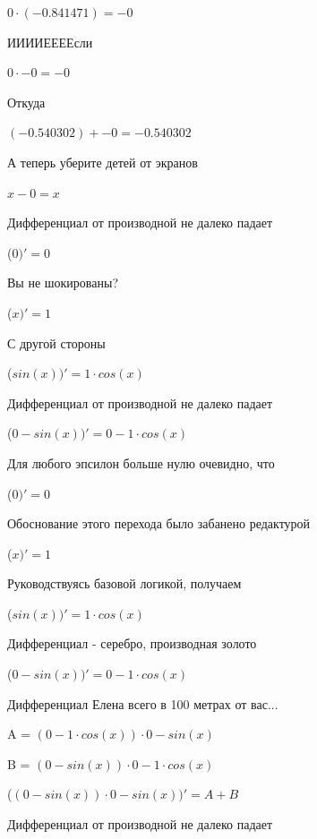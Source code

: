 \documentclass[12pt,a4paper,fleqn]{article}
\begin{document}
\begin{center}$0 \cdot (-0.841471) = -0$\end{center}
ИИИИЕЕЕЕсли\cite{link3}

\begin{center}$0 \cdot -0 = -0$\end{center}
Откуда

\begin{center}$(-0.540302)+-0 = -0.540302$\end{center}
А теперь уберите детей от экранов

\begin{center}
$x-0 = x$\end{center}
Дифференциал от производной не далеко падает\cite{link2}

\begin{center}
 ($0)'
  = 0$\end{center}
Вы не шокированы?\cite{link3}

\begin{center}
 ($x)'
  = 1$\end{center}
С другой стороны

\begin{center}
 ($sin(x))'
  = 1 \cdot cos(x)$\end{center}
Дифференциал от производной не далеко падает\cite{link2}

\begin{center}
 ($0-sin(x))'
  = 0-1 \cdot cos(x)$\end{center}
Для любого эпсилон больше нулю очевидно, что

\begin{center}
 ($0)'
  = 0$\end{center}
Обоснование этого перехода было забанено редактурой

\begin{center}
 ($x)'
  = 1$\end{center}
Руководствуясь базовой логикой, получаем

\begin{center}
 ($sin(x))'
  = 1 \cdot cos(x)$\end{center}
Дифференциал - серебро, производная золото\cite{link2}

\begin{center}
 ($0-sin(x))'
  = 0-1 \cdot cos(x)$\end{center}
Дифференциал Елена всего в 100 метрах от вас...

\begin{center}
A = $(0-1 \cdot cos(x)) \cdot 0-sin(x)$\end{center}
\begin{center}
B = $(0-sin(x)) \cdot 0-1 \cdot cos(x)$\end{center}
\begin{center}
 ($(0-sin(x)) \cdot 0-sin(x))'
  = A+B$\end{center}
Дифференциал от производной не далеко падает\cite{link2}
\end{document}
